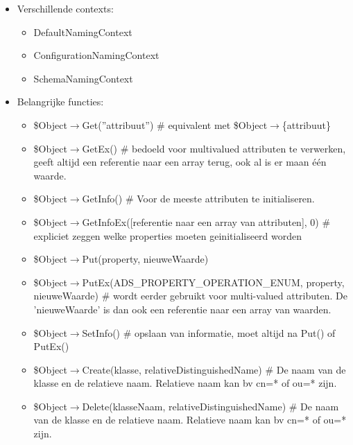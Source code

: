 \documentclass{report}
\begin{document}
\begin{itemize}
    \item Verschillende contexts:
    \begin{itemize}
        \item DefaultNamingContext
        \item ConfigurationNamingContext
        \item SchemaNamingContext
    \end{itemize}

    \item Belangrijke functies:
    \begin{itemize}
        \item \$Object\(\rightarrow \)Get(''attribuut'') \# equivalent met \$Object\(\rightarrow \)\{attribuut\}
        \item \$Object\(\rightarrow \)GetEx() \# bedoeld voor multivalued attributen te verwerken, geeft altijd een referentie naar een array terug, ook al is er maan één waarde.
        \item \$Object\(\rightarrow \)GetInfo() \# Voor de meeste attributen te initialiseren.
        \item \$Object\(\rightarrow \)GetInfoEx([referentie naar een array van attributen], 0) \# expliciet zeggen welke properties moeten geinitialiseerd worden
        \item \$Object\(\rightarrow\)Put(property, nieuweWaarde)
        \item \$Object\(\rightarrow\)PutEx(ADS\_PROPERTY\_OPERATION\_ENUM, property, nieuweWaarde) \# wordt eerder gebruikt voor multi-valued attributen. De 'nieuweWaarde' is dan ook een referentie naar een array van waarden.
        \item \$Object\(\rightarrow \)SetInfo() \# opslaan van informatie, moet altijd na Put() of PutEx()
        \item \$Object\(\rightarrow\)Create(klasse, relativeDistinguishedName) \# De naam van de klasse en de relatieve naam. Relatieve naam kan bv cn=* of ou=* zijn.
        \item \$Object\(\rightarrow\)Delete(klasseNaam, relativeDistinguishedName) \# De naam van de klasse en de relatieve naam. Relatieve naam kan bv cn=* of ou=* zijn.
    \end{itemize}


\end{itemize}
\end{document}
